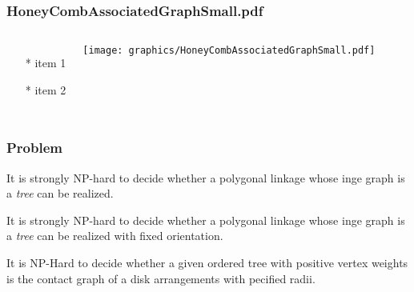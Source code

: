 \documentclass{beamer}
\begin{document}
\begin{frame} \frametitle{HoneyCombAssociatedGraphSmall.pdf}
    \begin{columns}[c]
        \begin{itemize}
            \item[*] item 1
            \item[*] item 2
        \end{itemize}
        \begin{minipage}{\linewidth}
            \begin{center}
            \texttt{[image: graphics/HoneyCombAssociatedGraphSmall.pdf]}
            \label{gfx:HoneyCombAssociatedGraphSmall.pdf}
            \end{center}
        \end{minipage}
    \end{columns}
\end{frame}
 \begin{frame}\frametitle{Problem}
    It is strongly NP-hard to decide whether a polygonal linkage whose inge graph is a \textit{tree} can be realized.

It is strongly NP-hard to decide whether a polygonal linkage whose inge graph is a \textit{tree} can be realized with fixed orientation.

It is NP-Hard to decide whether a given ordered tree with positive vertex weights is the contact graph of a disk arrangements with pecified radii.
  \end{frame}
\end{document}
